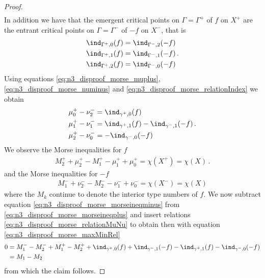 \begin{proof}
\begin{align}
  \end{align}
  In addition we have that the emergent critical points on $\Gamma=\Gamma^+$ of $f$ on $X^+$ are the
  entrant critical points on $\Gamma=\Gamma^-$ of $-f$ on $X^-$, that is
  \begin{equation}
    \begin{aligned}
      \ind_{\Gamma^+,0}(f)&=\ind_{\Gamma^-,2}(-f) \\
      \ind_{\Gamma^+,1}(f)&=\ind_{\Gamma^-,1}(-f) \\
      \ind_{\Gamma^+,2}(f)&=\ind_{\Gamma^-,0}(-f)\label{eq:n3_disproof_morse_relationIndex} 
    \end{aligned}\,.
  \end{equation}
  Using equations \eqref{eq:n3_disproof_morse_muplus}, \eqref{eq:n3_disproof_morse_numinus} and \eqref{eq:n3_disproof_morse_relationIndex}
  we obtain
  \begin{equation}
    \begin{aligned}
      \mu^+_0-\nu^-_2&=\ind_{\gamma^+,0}(f) \\
      \mu^+_1-\nu^-_1&=\ind_{\gamma^+,1}(f)-\ind_{\gamma^-,1}(-f) \\
      \mu^+_2-\nu^-_0&=-\ind_{\gamma^-,0}(-f)
    \end{aligned}\,.\label{eq:n3_disproof_morse_relationMuNu}
  \end{equation}
  We observe the Morse inequalities for $f$
  \begin{align}
    M_2^++\mu^+_2-M_1^+-\mu^+_1+\mu^+_0=\chi(X^+)=\chi(X)\,.\label{eq:n3_disproof_morse_morseineqplus}
  \end{align}
  and the Morse inequalities for $-f$
  \begin{align}
    M_1^-+\nu^-_2-M_2^--\nu^-_1+\nu^-_0=\chi(X^-)=\chi(X)\label{eq:n3_disproof_morse_morseineqminus}
  \end{align}
  where the $M_k$ continue to denote the interior type numbers of $f$.
  We now subtract equation \eqref{eq:n3_disproof_morse_morseineqminus} from \eqref{eq:n3_disproof_morse_morseineqplus}
  and insert relations \eqref{eq:n3_disproof_morse_relationMuNu} to obtain
  then with equation \eqref{eq:n3_disproof_morse_maxMinRel}
  \begin{align*}
    0&=M_1^--M_2^-+M_1^+-M_2^++\ind_{\gamma^+,0}(f)+\ind_{\gamma^-,1}(-f)-\ind_{\gamma^+,1}(f)-\ind_{\gamma^-,0}(-f) \\
    &= M_1-M_2
  \end{align*}
  from which the claim follows.


\end{proof}
